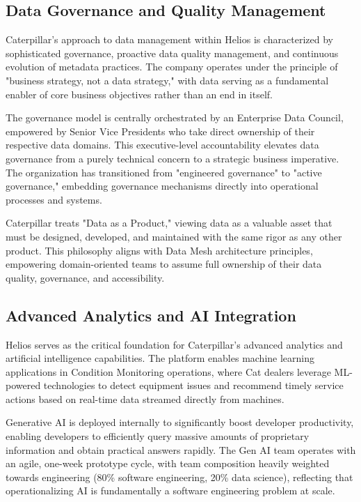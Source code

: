\documentclass[12pt, a4paper]{article} %
\begin{document}
\subsection{Data Governance and Quality Management}
Caterpillar's approach to data management within Helios is characterized by sophisticated governance, proactive data quality management, and continuous evolution of metadata practices. The company operates under the principle of "business strategy, not a data strategy," with data serving as a fundamental enabler of core business objectives rather than an end in itself.

The governance model is centrally orchestrated by an Enterprise Data Council, empowered by Senior Vice Presidents who take direct ownership of their respective data domains. This executive-level accountability elevates data governance from a purely technical concern to a strategic business imperative. The organization has transitioned from "engineered governance" to "active governance," embedding governance mechanisms directly into operational processes and systems.

Caterpillar treats "Data as a Product," viewing data as a valuable asset that must be designed, developed, and maintained with the same rigor as any other product. This philosophy aligns with Data Mesh architecture principles, empowering domain-oriented teams to assume full ownership of their data quality, governance, and accessibility.

\subsection{Advanced Analytics and AI Integration}
Helios serves as the critical foundation for Caterpillar's advanced analytics and artificial intelligence capabilities. The platform enables machine learning applications in Condition Monitoring operations, where Cat dealers leverage ML-powered technologies to detect equipment issues and recommend timely service actions based on real-time data streamed directly from machines.

Generative AI is deployed internally to significantly boost developer productivity, enabling developers to efficiently query massive amounts of proprietary information and obtain practical answers rapidly. The Gen AI team operates with an agile, one-week prototype cycle, with team composition heavily weighted towards engineering (80\% software engineering, 20\% data science), reflecting that operationalizing AI is fundamentally a software engineering problem at scale.
\end{document}
